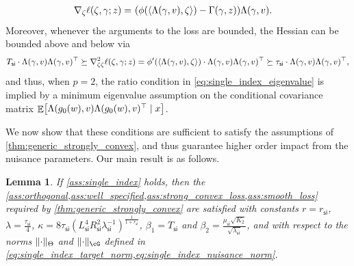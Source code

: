 \documentclass[11pt]{article} %
\newcommand{\pref}[1]{\cref{#1}}
\theoremstyle{theorem}  %
\newtheorem{lemma}{Lemma}
\theoremstyle{plain}
\DeclarePairedDelimiter{\brk}{[}{]}
\DeclarePairedDelimiter{\prn}{(}{)}
\DeclarePairedDelimiter{\nrm}{\|}{\|}
\DeclarePairedDelimiter{\tri}{\langle}{\rangle}
\DeclareMathOperator{\En}{\mathbb{E}}
\newcommand{\trn}{\top}
\renewcommand{\trn}{\dagger}
\newcommand{\varone}{w} %
\newcommand{\vartwo}{x} %
\newcommand{\nuisance}{\cG}
\newcommand{\target}{\Theta}
\newcommand{\dimtwo}{K_2}
\newcommand{\gtone}{g_0}
\renewcommand{\trn}{\top}
\newcommand{\si}{\mathsf{si}}
\newcommand{\Lsi}{L_{\si}}
\newcommand{\Rsi}{R_{\si}}
\newcommand{\Tsi}{T_{\si}}
\newcommand{\tausi}{\tau_{\si}}
\newcommand{\musi}{\mu_{\si}}
\newcommand{\gammasi}{\lambda_{\si}}
\newcommand{\lambdasi}{\gammasi}
\newcommand{\rsi}{r_{\si}}
\begin{document}
\begin{align*}
\nabla_{\zeta} \ell(\zeta, \gamma; z) =~&  \prn*{\phi(\tri{\Lambda(\gamma, v), \zeta}) - \Gamma(\gamma, z)}\Lambda(\gamma, v).
\end{align*}
Moreover, whenever the arguments to the loss are bounded, the Hessian can be bounded above and below via
\begin{equation}\label{eqn:hessian_bounds_single_index}
\Tsi \cdot \Lambda(\gamma, v) \Lambda(\gamma, v)^{\trn}
\succeq
\nabla_{\zeta\zeta}^2 \ell(\zeta, \gamma; z) = \phi'(\tri{\Lambda(\gamma, v), \zeta}) \cdot  \Lambda(\gamma, v) \Lambda(\gamma, v)^{\trn}
\succeq \tausi \cdot \Lambda(\gamma, v) \Lambda(\gamma, v)^{\trn},
\end{equation}
and thus, when $p=2$,  the ratio condition in \pref{eq:single_index_eigenvalue} is implied by a minimum eigenvalue assumption on the conditional covariance matrix $\En\brk*{\Lambda(\gtone(\varone), v) \Lambda(\gtone(\varone), v)^{\trn} \mid \vartwo}$.

We now show that these conditions are sufficient to satisfy the assumptions of \pref{thm:generic_strongly_convex}, and thus guarantee higher order impact from the nuisance parameters. Our main result is as follows.
\begin{lemma}\label{lem:suff_single_index}
  If \pref{ass:single_index} holds, then the \pref{ass:orthogonal,ass:well_specified,ass:strong_convex_loss,ass:smooth_loss} required by \pref{thm:generic_strongly_convex} are satisfied with constants $r=\rsi$, $\lambda = \frac{\tausi}{4}$,  $\kappa=8\tausi(\Lsi^4\Rsi^2\lambdasi^{-1})^{\frac{1}{1+\rsi}}$, $\beta_1=\Tsi$ and $\beta_2= \frac{\musi \sqrt{\dimtwo}}{\sqrt{\gammasi}}$, and with respect to the norms $\nrm{\cdot}_{\target}$ and $\nrm{\cdot}_{\nuisance}$ defined in \pref{eq:single_index_target_norm,eq:single_index_nuisance_norm}.
%
%
\end{lemma}
\end{document}
